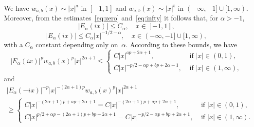 \documentclass[a4paper]{amsart}
\theoremstyle{plain}
\theoremstyle{remark}
\begin{document}
We have $w_{a,b}(x) \sim |x|^a$ in $[-1,1]$ and $w_{a,b}(x) \sim |x|^b$ in $(-\infty,-1] \cup [1,\infty)$.
Moreover, from the estimates~\eqref{eq:zero} and~\eqref{eq:infty} it follows that, for $\alpha>-1$,
\begin{equation*}
    |E_\alpha(ix)| \le C_\alpha,
    \quad x \in [-1,1],
\end{equation*}
\begin{equation*}
    |E_\alpha(ix)| \le C_\alpha |x|^{-1/2-\alpha},
    \quad x \in (-\infty,-1] \cup [1,\infty),
\end{equation*}
with a $C_\alpha$ constant depending only on~$\alpha$.
According to these bounds, we have
\begin{equation*}
  |E_{\alpha}(ix)|^p w_{a,b}(x)^p |x|^{2\alpha+1}
  \le
  \begin{cases}
    C |x|^{ap + 2\alpha+1}, &{\text{ if }} |x| \in (0,1), \\
    C |x|^{-p/2 - \alpha p + bp + 2\alpha+1}, &{\text{ if }} |x| \in (1,\infty),
  \end{cases}
\end{equation*}
and
\begin{multline*}
  |E_{\alpha}(-ix)|^{-p} |x|^{-(2\alpha+1)p} w_{a,b}(x)^p |x|^{2\alpha+1} \\
  \ge
  \begin{cases}
    C |x|^{-(2\alpha+1)p + ap + 2\alpha+1} 
      = C |x|^{-(2\alpha+1)p + ap + 2\alpha+1}, &{\text{ if }} |x| \in (0,1), \\
    C |x|^{p/2 + \alpha p -(2\alpha+1)p + bp + 2\alpha+1}
      = C |x|^{-p/2 - \alpha p + bp + 2\alpha+1}, &{\text{ if }} |x| \in (1,\infty).
  \end{cases}
\end{multline*}
\end{document}
